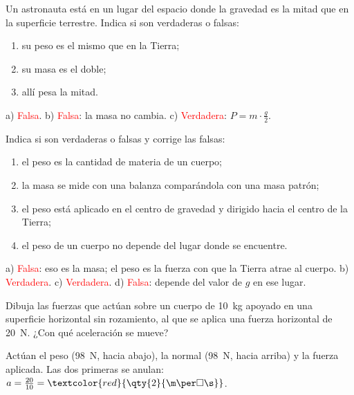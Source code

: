\begin{exercise}
    Un astronauta está en un lugar del espacio donde la gravedad es la mitad que en la superficie terrestre. Indica si son verdaderas o falsas:
    \begin{enumerate}[label=\alph*)]
        \item su peso es el mismo que en la Tierra;
        \item su masa es el doble;
        \item allí pesa la mitad.
    \end{enumerate}
    \begin{solu}
        a) \textcolor{red}{Falsa}. b) \textcolor{red}{Falsa}: la masa no cambia. c) \textcolor{red}{Verdadera}: \(P = m \cdot \frac{g}{2}\).
    \end{solu}
\end{exercise}

\begin{exercise}
    Indica si son verdaderas o falsas y corrige las falsas:
    \begin{enumerate}[label=\alph*)]
        \item el peso es la cantidad de materia de un cuerpo;
        \item la masa se mide con una balanza comparándola con una masa patrón;
        \item el peso está aplicado en el centro de gravedad y dirigido hacia el centro de la Tierra;
        \item el peso de un cuerpo no depende del lugar donde se encuentre.
    \end{enumerate}
    \begin{solu}
        a) \textcolor{red}{Falsa}: eso es la masa; el peso es la fuerza con que la Tierra atrae al cuerpo. b) \textcolor{red}{Verdadera}. c) \textcolor{red}{Verdadera}. d) \textcolor{red}{Falsa}: depende del valor de \(g\) en ese lugar.
    \end{solu}
\end{exercise}

\begin{exercise}
    Dibuja las fuerzas que actúan sobre un cuerpo de \qty{10}{\kg} apoyado en una superficie horizontal sin rozamiento, al que se aplica una fuerza horizontal de \qty{20}{\newton}. ¿Con qué aceleración se mueve?
    \begin{solu}
        Actúan el peso (\qty{98}{\newton}, hacia abajo), la normal (\qty{98}{\newton}, hacia arriba) y la fuerza aplicada. Las dos primeras se anulan: \(a = \frac{20}{10} = \textcolor{red}{\qty{2}{\m\per\square\s}}\).
    \end{solu}
\end{exercise}

